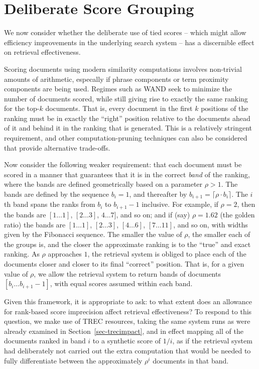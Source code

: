 \section{Deliberate Score Grouping}
\label{sec-roundingoff}

We now consider whether the deliberate use of tied scores -- which
might allow efficiency improvements in the underlying search system
-- has a discernible effect on retrieval effectiveness.


Scoring documents using modern similarity computations involves
non-trivial amounts of arithmetic, especally if phrase components or
term proximity components are being used.
Regimes such as WAND {\citep{bchsz03cikm}} seek to minimize the
number of documents scored, while still giving rise to exactly the
same ranking for the top-$k$ documents.
That is, every document in the first $k$ positions of the ranking
must be in exactly the ``right'' position relative to the documents
ahead of it and behind it in the ranking that is generated.
This is a relatively stringent requirement, and other
computation-pruning techniques can also be considered that provide
alternative trade-offs.

Now consider the following weaker requirement: that each document
must be scored in a manner that guarantees that it is in the correct
{\emph{band}} of the ranking, where the bands are defined
geometrically based on a parameter $\rho>1$.
The bands are defined by the sequence $b_i=1$, and thereafter by
$b_{i+1}=\lceil{\rho\cdot b_i}\rceil$.
The $i$\,th band spans the ranks from $b_i$ to $b_{i+1}-1$ inclusive.
For example, if $\rho=2$, then the bands are $[1\ldots1]$,
$[2\ldots3]$, $4\ldots7]$, and so on; and if (say) $\rho=1.62$ (the
golden ratio) the bands are $[1\ldots1]$, $[2\ldots3]$, $[4\ldots6]$,
$[7\ldots11]$, and so on, with widths given by the Fibonacci
sequence.
The smaller the value of $\rho$, the smaller each of the groups is,
and the closer the approximate ranking is to the ``true'' and exact
ranking.
As $\rho$ approaches $1$, the retrieval system is obliged to place
each of the documents closer and closer to its final ``correct''
position.
That is, for a given value of $\rho$, we allow the retrieval system
to return bands of documents $[b_i\ldots b_{i+1}-1]$, with equal
scores assumed within each band.


Given this framework, it is appropriate to ask: to what extent does
an allowance for rank-based score imprecision affect retrieval
effectiveness?
To respond to this question, we make use of TREC resources, taking
the same system runs as were already examined in
Section~\ref{sec-trecimpact}, and in effect mapping all of the
documents ranked in band $i$ to a synthetic score of $1/i$, as if the
retrieval system had deliberately not carried out the extra
computation that would be needed to fully differentiate between the
approximately $\rho^i$ documents in that band.


